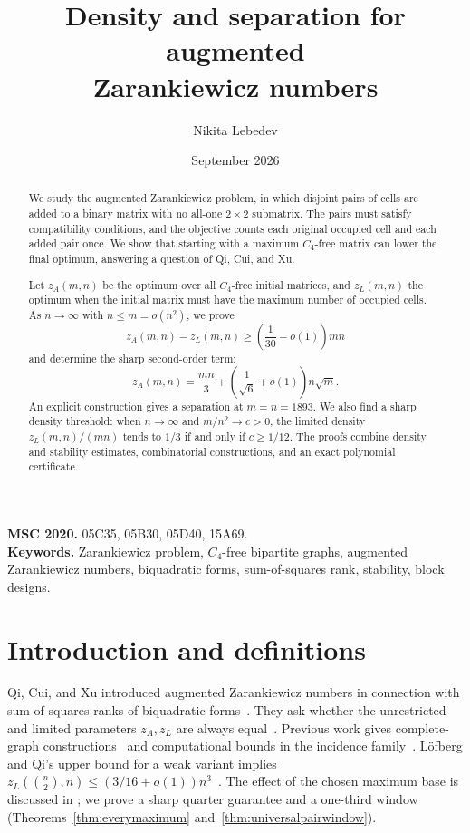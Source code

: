 \documentclass[11pt]{article}
\title{Density and separation for augmented\\Zarankiewicz numbers}
\author{Nikita Lebedev}
\date{September 2026}
\newcommand{\za}{z_A}
\newcommand{\zl}{z_L}
\begin{document}
\maketitle
\begin{abstract}
We study the augmented Zarankiewicz problem, in which disjoint pairs of
cells are added to a binary matrix with no all-one $2\times2$ submatrix.
The pairs must satisfy compatibility conditions, and the objective counts
each original occupied cell and each added pair once. We show that
starting with a maximum $C_4$-free matrix can lower the final optimum,
answering a question of Qi, Cui, and Xu.

Let $\za(m,n)$ be the optimum over all $C_4$-free initial matrices,
and $\zl(m,n)$ the optimum when the initial matrix must have the maximum
number of occupied cells. As $n\to\infty$ with $n\le m=o(n^2)$, we prove
\[
 \za(m,n)-\zl(m,n)\ge\left(\frac1{30}-o(1)\right)mn
\]
and determine the sharp second-order term:
\[
 \za(m,n)=\frac{mn}{3}+\left(\frac1{\sqrt6}+o(1)\right)n\sqrt m.
\]
An explicit construction gives a separation at $m=n=1893$.
We also find a sharp density threshold: when $n\to\infty$ and
$m/n^2\to c>0$, the limited density $\zl(m,n)/(mn)$ tends to $1/3$
if and only if $c\ge1/12$. The proofs combine density and stability estimates,
combinatorial constructions, and an exact polynomial certificate.
\end{abstract}
\noindent\textbf{MSC 2020.} 05C35, 05B30, 05D40, 15A69.\\
\textbf{Keywords.} Zarankiewicz problem, $C_4$-free bipartite graphs,
augmented Zarankiewicz numbers, biquadratic forms, sum-of-squares rank,
stability, block designs.

\section{Introduction and definitions}
Qi, Cui, and Xu introduced augmented Zarankiewicz numbers in connection
with sum-of-squares ranks of biquadratic forms~\cite{framework}.
They ask whether the unrestricted and limited parameters $\za,\zl$
are always equal~\cite[Remark 2.5]{framework}.
Previous work gives complete-graph constructions~\cite{general,k5}
and computational bounds in the incidence family~\cite{incidence}.
L\"ofberg and Qi's upper bound for a weak variant implies
$\zl(\binom n2,n)\le(3/16+o(1))n^3$~\cite[Corollary 7.2]{weakincidence}.
The effect of the chosen maximum base is discussed in
\cite[Appendix B]{general}; we prove a sharp quarter guarantee and a
one-third window (Theorems~\ref{thm:everymaximum} and~\ref{thm:universalpairwindow}).
\end{document}
